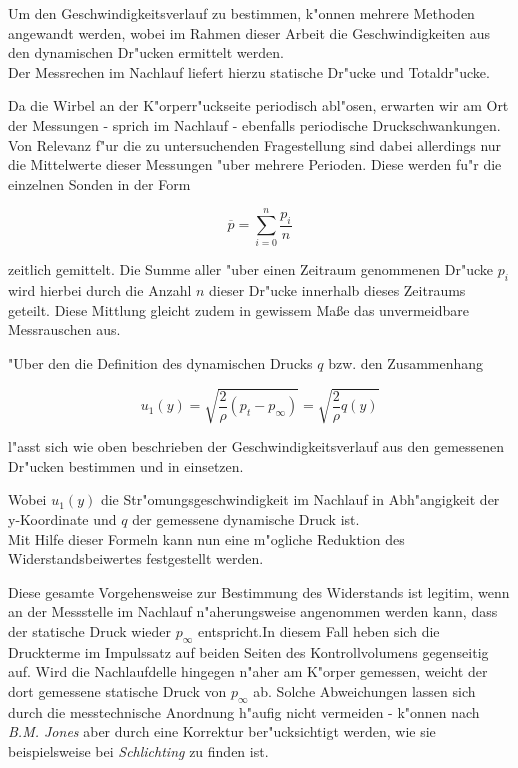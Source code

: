 Um den Geschwindigkeitsverlauf zu bestimmen, k"onnen mehrere Methoden angewandt werden, wobei im Rahmen dieser Arbeit die Geschwindigkeiten aus den dynamischen Dr"ucken ermittelt werden.\\
Der Messrechen im Nachlauf liefert hierzu statische Dr"ucke und Totaldr"ucke.

Da die Wirbel an der K"orperr"uckseite periodisch abl"osen, erwarten wir am Ort der Messungen - sprich im Nachlauf - ebenfalls periodische Druckschwankungen.
Von Relevanz f"ur die zu untersuchenden Fragestellung sind dabei allerdings nur die Mittelwerte dieser Messungen "uber mehrere Perioden.
Diese werden fu"r die einzelnen Sonden in der Form
\begin{center}	
	\begin{equation}
		\overline{p}=\sum_{i=0}^{n}\frac{p_i}{n}
	\end{equation}
\end{center}
zeitlich gemittelt.
Die Summe aller "uber einen Zeitraum genommenen Dr"ucke $p_i$ wird hierbei durch die Anzahl $n$ dieser Dr"ucke innerhalb dieses Zeitraums geteilt.
Diese Mittlung gleicht zudem in gewissem Ma\ss{}e das unvermeidbare Messrauschen aus.

"Uber den die Definition des dynamischen Drucks $q$ bzw. den Zusammenhang
\begin{center}
	\begin{equation}
		\label{geschwindigkeitsformel}
		u_{1}(y)= \sqrt{\frac{2}{\rho}(p_t - p_{\infty}) } = \sqrt{\frac{2}{\rho} q(y)}
	\end{equation}
\end{center}
l"asst sich wie oben beschrieben der Geschwindigkeitsverlauf aus den gemessenen Dr"ucken bestimmen und in  einsetzen.

Wobei $u_{1}(y)$ die Str"omungsgeschwindigkeit im Nachlauf in Abh"angigkeit der y-Koordinate und $q$ der gemessene dynamische Druck ist.\\
Mit Hilfe dieser Formeln kann nun eine m"ogliche Reduktion des Widerstandsbeiwertes festgestellt werden.

Diese gesamte Vorgehensweise zur Bestimmung des Widerstands ist legitim, wenn an der Messstelle im Nachlauf n"aherungsweise angenommen werden kann, dass der statische Druck wieder $p_\infty$ entspricht.In diesem Fall heben sich die Druckterme im Impulssatz auf  beiden Seiten des Kontrollvolumens gegenseitig auf.
Wird die Nachlaufdelle hingegen n"aher am K"orper gemessen, weicht der dort gemessene statische Druck von $p_{\infty}$ ab.
Solche Abweichungen lassen sich durch die messtechnische Anordnung h"aufig nicht vermeiden - 
k"onnen nach \textit{B.M. Jones} aber durch eine Korrektur ber"ucksichtigt werden, wie sie beispielsweise bei \textit{Schlichting} \cite{Schlichting.2001} zu finden ist.

